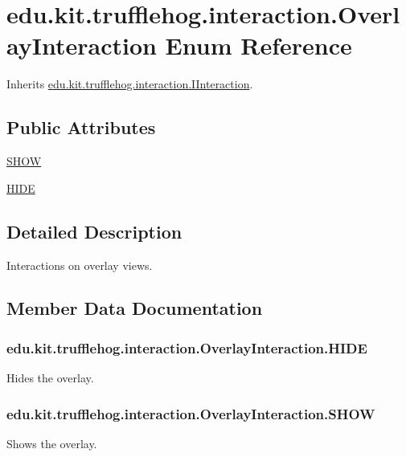 \hypertarget{enumedu_1_1kit_1_1trufflehog_1_1interaction_1_1_overlay_interaction}{}\section{edu.\+kit.\+trufflehog.\+interaction.\+Overlay\+Interaction Enum Reference}
\label{enumedu_1_1kit_1_1trufflehog_1_1interaction_1_1_overlay_interaction}


Inherits \hyperlink{interfaceedu_1_1kit_1_1trufflehog_1_1interaction_1_1_i_interaction}{edu.\+kit.\+trufflehog.\+interaction.\+I\+Interaction}.

\subsection*{Public Attributes}
\begin{DoxyCompactItemize}
\item 
\hyperlink{enumedu_1_1kit_1_1trufflehog_1_1interaction_1_1_overlay_interaction_af64f7cccc99d9de420b9be5fdad99eb4}{S\+H\+O\+W}
\item 
\hyperlink{enumedu_1_1kit_1_1trufflehog_1_1interaction_1_1_overlay_interaction_a972373616177ba06313c2d34d8f75a5c}{H\+I\+D\+E}
\end{DoxyCompactItemize}


\subsection{Detailed Description}
Interactions on overlay views. 

\subsection{Member Data Documentation}
\hypertarget{enumedu_1_1kit_1_1trufflehog_1_1interaction_1_1_overlay_interaction_a972373616177ba06313c2d34d8f75a5c}{}
\subsubsection[{H\+I\+D\+E}]{\setlength{\rightskip}{0pt plus 5cm}edu.\+kit.\+trufflehog.\+interaction.\+Overlay\+Interaction.\+H\+I\+D\+E}\label{enumedu_1_1kit_1_1trufflehog_1_1interaction_1_1_overlay_interaction_a972373616177ba06313c2d34d8f75a5c}
Hides the overlay. \hypertarget{enumedu_1_1kit_1_1trufflehog_1_1interaction_1_1_overlay_interaction_af64f7cccc99d9de420b9be5fdad99eb4}{}
\subsubsection[{S\+H\+O\+W}]{\setlength{\rightskip}{0pt plus 5cm}edu.\+kit.\+trufflehog.\+interaction.\+Overlay\+Interaction.\+S\+H\+O\+W}\label{enumedu_1_1kit_1_1trufflehog_1_1interaction_1_1_overlay_interaction_af64f7cccc99d9de420b9be5fdad99eb4}
Shows the overlay. 